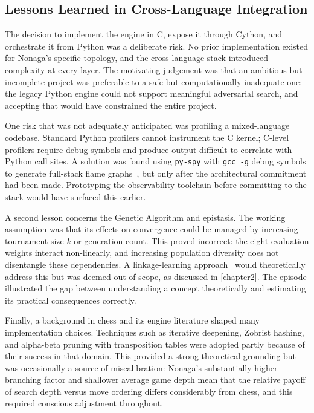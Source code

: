 \begin{appendices}
\subsection{Lessons Learned in Cross-Language Integration}

The decision to implement the engine in C, expose it through Cython, and orchestrate it from Python was a deliberate risk. No prior implementation existed for Nonaga's specific topology, and the cross-language stack introduced complexity at every layer. The motivating judgement was that an ambitious but incomplete project was preferable to a safe but computationally inadequate one: the legacy Python engine could not support meaningful adversarial search, and accepting that would have constrained the entire project.

One risk that was not adequately anticipated was profiling a mixed-language codebase. Standard Python profilers cannot instrument the C kernel; C-level profilers require debug symbols and produce output difficult to correlate with Python call sites. A solution was found using \texttt{py-spy} with \texttt{gcc -g} debug symbols to generate full-stack flame graphs~\cite{pyspy}, but only after the architectural commitment had been made. Prototyping the observability toolchain before committing to the stack would have surfaced this earlier.

A second lesson concerns the Genetic Algorithm and epistasis. The working assumption was that its effects on convergence could be managed by increasing tournament size $k$ or generation count. This proved incorrect: the eight evaluation weights interact non-linearly, and increasing population diversity does not disentangle these dependencies. A linkage-learning approach~\cite{newman2006use,pelikan1999boa} would theoretically address this but was deemed out of scope, as discussed in \cref{chapter2}. The episode illustrated the gap between understanding a concept theoretically and estimating its practical consequences correctly.

Finally, a background in chess and its engine literature shaped many implementation choices. Techniques such as iterative deepening, Zobrist hashing, and alpha-beta pruning with transposition tables were adopted partly because of their success in that domain. This provided a strong theoretical grounding but was occasionally a source of miscalibration: Nonaga's substantially higher branching factor and shallower average game depth mean that the relative payoff of search depth versus move ordering differs considerably from chess, and this required conscious adjustment throughout.


\end{appendices}

